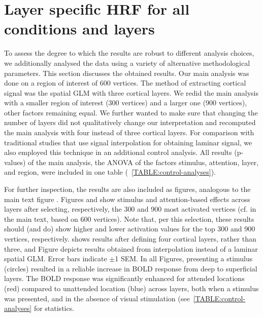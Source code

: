 \documentclass[9pt,lineno]{aperture}
\begin{document}
\appendix
\begin{appendixbox}
\label{first:app}
\section{Layer specific HRF for all conditions and layers}
To assess the degree to which the results are robust to different analysis choices, we additionally analysed the data using a variety of alternative methodological parameters. This section discusses the obtained results. Our main analysis was done on a region of interest of 600 vertices. The method of extracting cortical signal was the spatial GLM \citep{VanMourik2019} with three cortical layers. We redid the main analysis with a smaller region of interest (300 vertices) and a larger one (900 vertices), other factors remaining equal. We further wanted to make sure that changing the number of layers did not qualitatively change our interpretation and recomputed the main analysis with four instead of three cortical layers. For comparison with traditional studies that use signal interpolation for obtaining laminar signal, we also employed this technique in an additional control analysis. All results (p-values) of the main analysis, the ANOVA of the factors stimulus, attention, layer, and region, were included in one table (~\ref{TABLE:control-analyses}).

For further inspection, the results are also included as figures, analogous to the main text figure . Figures  and  show stimulus and attention-based effects across layers after selecting, respectively, the 300 and 900 most activated vertices (cf.  in the main text, based on 600 vertices). Note that, per this selection, these results should (and do) show higher and lower activation values for the top 300 and 900 vertices, respectively. 
 shows results after defining four cortical layers, rather than three, and Figure  depicts results obtained from interpolation instead of a laminar spatial GLM. Error bars indicate $\pm$1 SEM. 
In all Figures, presenting a stimulus (circles) resulted in a reliable increase in BOLD response from deep to superficial layers. The BOLD response was significantly enhanced for attended locations (red) compared to unattended location (blue) across layers, both when a stimulus was presented, and in the absence of visual stimulation (see~\ref{TABLE:control-analyses} for statistics. 


\end{appendixbox}
\end{document}
